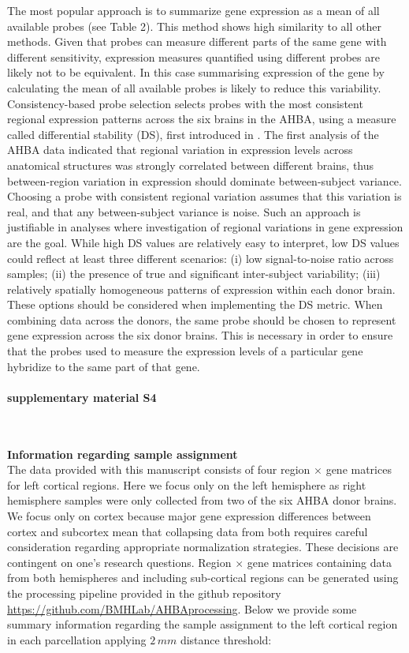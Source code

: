 \documentclass[10pt,A4]{article}
\begin{document}
The most popular approach is to summarize gene expression as a mean of all available probes (see Table 2). This method shows high similarity to all other methods. Given that probes can measure different parts of the same gene with different sensitivity, expression measures quantified using different probes are likely not to be equivalent. In this case summarising expression of the gene by calculating the mean of all available probes is likely to reduce this variability. 
Consistency-based probe selection selects probes with the most consistent regional expression patterns across the six brains in the AHBA, using a measure called differential stability (DS), first introduced in  \citet{Hawrylycz2015}. The first analysis of the AHBA data indicated that regional variation in expression levels across anatomical structures was strongly correlated between different brains, thus between-region variation in expression should dominate between-subject variance. Choosing a probe with consistent regional variation assumes that this variation is real, and that any between-subject variance is noise. Such an approach is justifiable in analyses where investigation of regional variations in gene expression are the goal. While high DS values are relatively easy to interpret, low DS values could reflect at least three different scenarios: (i) low signal-to-noise ratio across samples; (ii) the presence of true and significant inter-subject variability; (iii) relatively spatially homogeneous patterns of expression within each donor brain. These options should be considered when implementing the DS metric.
When combining data across the donors, the same probe should be chosen to represent gene expression across the six donor brains. This is necessary in order to ensure that the probes used to measure the expression levels of a particular gene hybridize to the same part of that gene.

\paragraph*{supplementary material S4}\mbox{}\\
\label{SItext4}

\textbf{Information regarding sample assignment}\\
The data provided with this manuscript consists of four region $\times$ gene matrices for left cortical regions. Here we focus only on the left hemisphere as right hemisphere samples were only collected from two of the six AHBA donor brains. We focus only on cortex because major gene expression differences between cortex and subcortex mean that collapsing data from both requires careful consideration regarding appropriate normalization strategies. These decisions are contingent on one’s research questions. Region $\times$ gene matrices containing data from both hemispheres and including sub-cortical regions can be generated using the processing pipeline provided in the github repository \url{https://github.com/BMHLab/AHBAprocessing}. Below we provide some summary information regarding the sample assignment to the left cortical region in each parcellation applying $2\,mm$ distance threshold:
\end{document}
